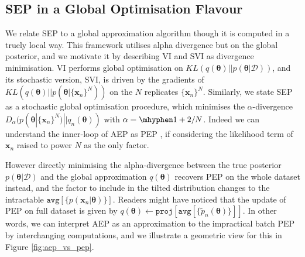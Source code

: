 \documentclass{article} %
\begin{document}
%
\subsection{SEP in a Global Optimisation Flavour}
We relate SEP to a global approximation algorithm though it is computed in a truely local way. This framework utilises alpha divergence but on the global posterior, and we motivate it by describing VI and SVI as divergence minimisation.
%
VI performs global optimisation on $KL(q(\bm{\theta})||p(\bm{\theta}|\mathcal{D}))$, and its stochastic version, SVI, is driven by the gradients of $KL(q(\bm{\theta}) || p(\bm{\theta} | \{\bm{x}_n\}^N))$ on the $N$ replicates $\{\bm{x}_n\}^N$. Similarly, we state SEP as a stochastic global optimisation procedure, which minimises the $\alpha$-divergence $D_{\alpha}(p(\bm{\theta} | \{\bm{x}_n\}^N) || q_n(\bm{\theta}))$ with $\alpha = \mhyphen 1 + 2/N$. Indeed we can understand the inner-loop of AEP as PEP \cite{minka:powerep}, if considering the likelihood term of $\bm{x}_n$ raised to power $N$ as the only factor.

However directly minimising the alpha-divergence between the true posterior $p(\bm{\theta}|\mathcal{D})$ and the global approximation $q(\bm{\theta})$ recovers PEP on the whole dataset instead, and the factor to include in the tilted distribution changes to the intractable $\mathtt{avg}[\{p(\bm{x}_n | \bm{\theta}) \}]$. Readers might have noticed that the update of PEP on full dataset is given by $q(\bm{\theta}) \leftarrow \mathtt{proj}[\mathtt{avg}[\{ \tilde{p}_n(\bm{\theta}) \}]]$. In other words, we can interpret AEP as an approximation to the impractical batch PEP by interchanging computations, and we illustrate a geometric view for this in Figure \ref{fig:aep_vs_pep}.
\end{document}

